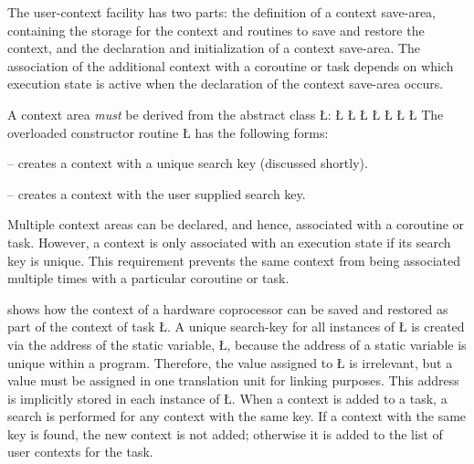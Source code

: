 \documentclass[openright,twoside]{report}
\begin{document}
The user-context facility has two parts: the definition of a context save-area, containing the storage for the context and routines to save and restore the context, and the declaration and initialization of a context save-area.
The association of the additional context with a coroutine or task depends on which execution state is active when the declaration of the context save-area occurs.

A context area \emph{must} be derived from the abstract class \LGinlinetrue\LGbegin\lgrinde\L{}\endlgrinde\LGend{}:
\LGinlinefalse\LGbegin\lgrinde
\L{}
\L{}
\L{\LB{}}
\L{\LB{}}
\L{\LB{}}
\L{\LB{}}
\L{}
\CE{}\endlgrinde\LGend
The overloaded constructor routine \LGinlinetrue\LGbegin\lgrinde\L{}\endlgrinde\LGend{} has the following forms:
\begin{prefix}
\item[\LGinlinetrue\LGbegin\lgrinde\L{\LB{\V{uContext}()}}\endlgrinde\LGend{}]
-- creates a context with a unique search key (discussed shortly).

\item[\LGinlinetrue\LGbegin\lgrinde\L{\LB{\V{uContext}(\0\K{void}\0\*\0\V{key}\0)}}\endlgrinde\LGend{}]
-- creates a context with the user supplied search key.
\end{prefix}
Multiple context areas can be declared, and hence, associated with a coroutine or task.
However, a context is only associated with an execution state if its search key is unique.
This requirement prevents the same context from being associated multiple times with a particular coroutine or task.

 shows how the context of a hardware coprocessor can be saved and restored as part of the context of task \LGinlinetrue\LGbegin\lgrinde\L{}\endlgrinde\LGend{}.
A unique search-key for all instances of \LGinlinetrue\LGbegin\lgrinde\L{}\endlgrinde\LGend{} is created via the address of the static variable, \LGinlinetrue\LGbegin\lgrinde\L{}\endlgrinde\LGend{}, because the address of a static variable is unique within a program.
Therefore, the value assigned to \LGinlinetrue\LGbegin\lgrinde\L{}\endlgrinde\LGend{} is irrelevant, but a value must be assigned in one translation unit for linking purposes.
This address is implicitly stored in each instance of \LGinlinetrue\LGbegin\lgrinde\L{}\endlgrinde\LGend{}.
When a context is added to a task, a search is performed for any context with the same key.
If a context with the same key is found, the new context is not added;
otherwise it is added to the list of user contexts for the task.
\end{document}
